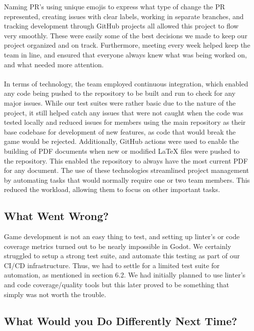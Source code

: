 \documentclass{article}
\begin{document}
Naming PR's using unique emojis to express what type of change the PR represented, creating issues with clear labels, working in separate branches, and tracking development through GitHub projects all allowed this project to flow very smoothly. These were easily some of the best decisions we made to keep our project organized and on track. Furthermore, meeting every week helped keep the team in line, and ensured that everyone always knew what was being worked on, and what needed more attention.
\\
\\
In terms of technology, the team employed continuous integration, which enabled any code being pushed to the repository to be built and run to check for any major issues. While our test suites were rather basic due to the nature of the project, it still helped catch any issues that were not caught when the code was tested locally and reduced issues for members using the main repository as their base codebase for development of new features, as code that would break the game would be rejected. Additionally, GitHub actions were used to enable the building of PDF documents when new or modified LaTeX files were pushed to the repository. This enabled the repository to always have the most current PDF for any document. The use of these technologies streamlined project management by automating tasks that would normally require one or two team members. This reduced the workload, allowing them to focus on other important tasks.

\subsection{What Went Wrong?}

Game development is not an easy thing to test, and setting up linter's or code coverage metrics turned out to be nearly impossible in Godot. We certainly struggled to setup a strong test suite, and automate this testing as part of our CI/CD infrastructure. Thus, we had to settle for a limited test suite for automation, as mentioned in section 6.2. We had initially planned to use linter's and code coverage/quality tools but this later proved to be something that simply was not worth the trouble. 

\subsection{What Would you Do Differently Next Time?}
\end{document}
